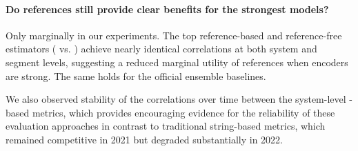 \begin{mdframed}[
    linecolor=gray,
    linewidth=2pt,
    roundcorner=5,
    backgroundcolor=gray!5
]
\paragraph{Do references still provide clear benefits for the strongest models?}
Only marginally in our experiments. The top reference-based and reference-free estimators (\cometm{\fernet} vs. \cometq{\fernet}) achieve nearly identical correlations at both system and segment levels, suggesting a reduced marginal utility of references when encoders are strong. The same holds for the official ensemble baselines.

We also observed  stability of the correlations over time between the system-level \comet-based metrics, which provides encouraging evidence for the reliability of these evaluation approaches in contrast to traditional string-based metrics, which  remained competitive in 2021 but degraded substantially in 2022. 

\end{mdframed}


